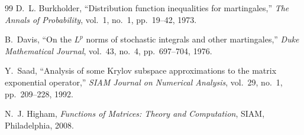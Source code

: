 \documentclass[11pt,a4paper,reqno]{article}
\theoremstyle{definition}
\theoremstyle{remark}
\begin{document}
\begin{thebibliography}{99}
D.~L. Burkholder,
``Distribution function inequalities for martingales,''
\emph{The Annals of Probability}, vol.~1, no.~1, pp.~19--42, 1973.

B.~Davis,
``On the $L^p$ norms of stochastic integrals and other martingales,''
\emph{Duke Mathematical Journal}, vol.~43, no.~4, pp.~697--704, 1976.

Y.~Saad,
``Analysis of some Krylov subspace approximations to the matrix exponential operator,''
\emph{SIAM Journal on Numerical Analysis}, vol.~29, no.~1, pp.~209--228, 1992.

N.~J. Higham,
\emph{Functions of Matrices: Theory and Computation},
SIAM, Philadelphia, 2008.

\end{thebibliography}
\end{document}
